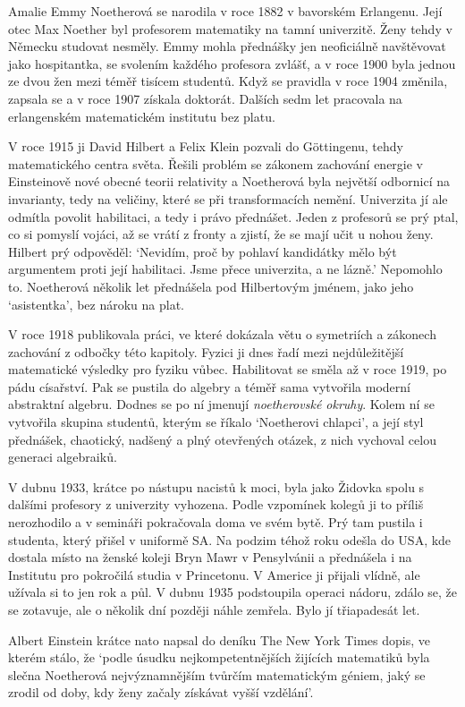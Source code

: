 Amalie Emmy Noetherová se narodila v roce 1882 v bavorském Erlangenu. Její otec Max Noether byl profesorem matematiky na tamní univerzitě. Ženy tehdy v Německu studovat nesměly. Emmy mohla přednášky jen neoficiálně navštěvovat jako hospitantka, se svolením každého profesora zvlášť, a v roce 1900 byla jednou ze dvou žen mezi téměř tisícem studentů. Když se pravidla v roce 1904 změnila, zapsala se a v roce 1907 získala doktorát. Dalších sedm let pracovala na erlangenském matematickém institutu bez platu.

V roce 1915 ji David Hilbert a Felix Klein pozvali do Göttingenu, tehdy matematického centra světa. Řešili problém se zákonem zachování energie v Einsteinově nové obecné teorii relativity a Noetherová byla největší odbornicí na invarianty, tedy na veličiny, které se při transformacích nemění. Univerzita jí ale odmítla povolit habilitaci, a tedy i právo přednášet. Jeden z profesorů se prý ptal, co si pomyslí vojáci, až se vrátí z fronty a zjistí, že se mají učit u nohou ženy. Hilbert prý odpověděl: `Nevidím, proč by pohlaví kandidátky mělo být argumentem proti její habilitaci. Jsme přece univerzita, a ne lázně.' Nepomohlo to. Noetherová několik let přednášela pod Hilbertovým jménem, jako jeho `asistentka', bez nároku na plat.

V roce 1918 publikovala práci, ve které dokázala větu o symetriích a zákonech zachování z odbočky této kapitoly. Fyzici ji dnes řadí mezi nejdůležitější matematické výsledky pro fyziku vůbec. Habilitovat se směla až v roce 1919, po pádu císařství. Pak se pustila do algebry a téměř sama vytvořila moderní abstraktní algebru. Dodnes se po ní jmenují \textit{noetherovské okruhy}. Kolem ní se vytvořila skupina studentů, kterým se říkalo `Noetherovi chlapci', a její styl přednášek, chaotický, nadšený a plný otevřených otázek, z nich vychoval celou generaci algebraiků.

V dubnu 1933, krátce po nástupu nacistů k moci, byla jako Židovka spolu s dalšími profesory z univerzity vyhozena. Podle vzpomínek kolegů ji to příliš nerozhodilo a v semináři pokračovala doma ve svém bytě. Prý tam pustila i studenta, který přišel v uniformě SA. Na podzim téhož roku odešla do USA, kde dostala místo na ženské koleji Bryn Mawr v Pensylvánii a přednášela i na Institutu pro pokročilá studia v Princetonu. V Americe ji přijali vlídně, ale užívala si to jen rok a půl. V dubnu 1935 podstoupila operaci nádoru, zdálo se, že se zotavuje, ale o několik dní později náhle zemřela. Bylo jí třiapadesát let.

Albert Einstein krátce nato napsal do deníku The New York Times dopis, ve kterém stálo, že `podle úsudku nejkompetentnějších žijících matematiků byla slečna Noetherová nejvýznamnějším tvůrčím matematickým géniem, jaký se zrodil od doby, kdy ženy začaly získávat vyšší vzdělání'.

